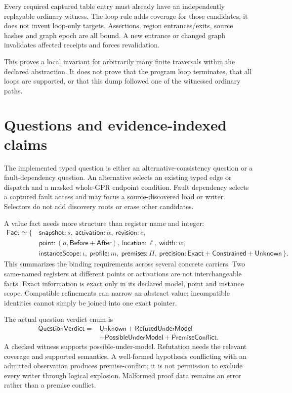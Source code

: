 \documentclass[11pt,a4paper]{article}
\newcommand{\ty}[1]{\mathsf{#1}}
\newcommand{\rec}[1]{\{\,#1\,\}}
\begin{document}
Every required captured table entry must already have an independently
replayable ordinary witness. The loop rule adds coverage for those candidates;
it does not invent loop-only targets. Assertions, region entrances/exits,
source hashes and graph epoch are all bound. A new entrance or changed graph
invalidates affected receipts and forces revalidation.

This proves a local invariant for arbitrarily many finite traversals within
the declared abstraction. It does not prove that the program loop terminates,
that all loops are supported, or that this dump followed one of the witnessed
ordinary paths.

\section{Questions and evidence-indexed claims}
\label{app:questions}
The implemented typed question is either an alternative-consistency question
or a fault-dependency question. An alternative selects an existing typed edge
or dispatch and a masked whole-GPR endpoint condition. Fault dependency selects
a captured fault access and may focus a source-discovered load or writer.
Selectors do not add discovery roots or erase other candidates.

A value fact needs more structure than register name and integer:
\[
\begin{aligned}
\ty{Fact}\simeq\rec{
 &\ty{snapshot}:s,\ \ty{activation}:\alpha,\ \ty{revision}:e,\\
 &\ty{point}:(a,\ty{Before}+\ty{After}),\ \ty{location}:\ell,\ \ty{width}:w,\\
 &\ty{instanceScope}:\iota,\ \ty{profile}:m,\ \ty{premises}:\Pi,
 \ \ty{precision}:\ty{Exact}+\ty{Constrained}+\ty{Unknown}}.
\end{aligned}
\]
This summarizes the binding requirements across several concrete carriers.
Two same-named registers at different points or activations are not
interchangeable facts. Exact information is exact only in its declared model,
point and instance scope. Compatible refinements can narrow an abstract value;
incompatible identities cannot simply be joined into one exact pointer.

The actual question verdict enum is
\[
\begin{aligned}
\ty{QuestionVerdict}={}&\ty{Unknown}+\ty{RefutedUnderModel}\\
 &+\ty{PossibleUnderModel}+\ty{PremiseConflict}.
\end{aligned}
\]
A checked witness supports possible-under-model. Refutation needs the relevant
coverage and supported semantics. A well-formed hypothesis conflicting with
an admitted observation produces premise-conflict; it is not permission to
exclude every writer through logical explosion. Malformed proof data remains
an error rather than a premise conflict.
\end{document}
